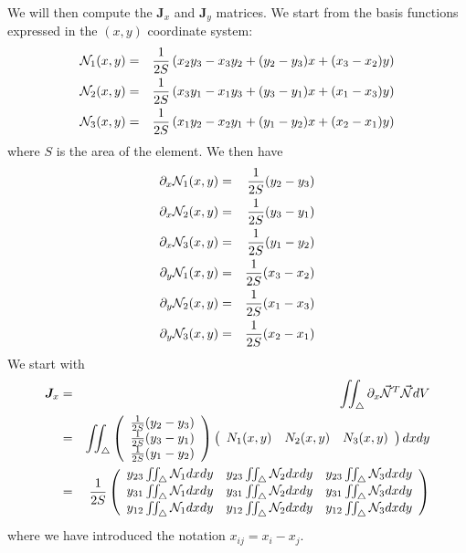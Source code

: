 We will then compute the ${\bm J}_x$ and ${\bm J}_y$ matrices.
We start from the basis functions expressed in the $(x,y)$ coordinate system:
\begin{eqnarray}
{\mathcal{N}}_1(x,y) &=& \frac{1}{2S} \left( x_2y_3-x_3y_2+(y_2-y_3)x+(x_3-x_2)y   \right) \nonumber\\
{\mathcal{N}}_2(x,y) &=& \frac{1}{2S} \left( x_3y_1-x_1y_3+(y_3-y_1)x+(x_1-x_3)y   \right) \nonumber\\
{\mathcal{N}}_3(x,y) &=& \frac{1}{2S} \left( x_1y_2-x_2y_1+(y_1-y_2)x+(x_2-x_1)y   \right) \nonumber
\end{eqnarray}
where $S$ is the area of the element.
We then have 
\begin{eqnarray}
\partial_x {\mathcal{N}}_1(x,y) &=& \frac{1}{2S}  (y_2-y_3) \nonumber\\
\partial_x {\mathcal{N}}_2(x,y) &=& \frac{1}{2S}  (y_3-y_1) \nonumber\\
\partial_x {\mathcal{N}}_3(x,y) &=& \frac{1}{2S}  (y_1-y_2) \nonumber\\
\partial_y {\mathcal{N}}_1(x,y) &=& \frac{1}{2S}  (x_3-x_2) \nonumber\\
\partial_y {\mathcal{N}}_2(x,y) &=& \frac{1}{2S}  (x_1-x_3) \nonumber\\
\partial_y {\mathcal{N}}_3(x,y) &=& \frac{1}{2S}  (x_2-x_1) \nonumber
\end{eqnarray}
We start with
\begin{eqnarray}
{\bm J}_x
&=& \iint_\triangle  \partial_x \vec{{\mathcal{N}}}^T \vec{{\mathcal{N}}} dV \nonumber\\
&=&  \iint_\triangle 
\left(
\begin{array}{c}
\frac{1}{2S}(y_2-y_3) \\
\frac{1}{2S}(y_3-y_1) \\
\frac{1}{2S}(y_1-y_2)
\end{array}
\right)
\left(
\begin{array}{ccc}
N_1(x,y) & N_2(x,y) & N_3(x,y) 
\end{array}
\right) dx dy \nonumber\\
&=& \frac{1}{2S} 
\left(
\begin{array}{ccc}
y_{23} \iint_\triangle {\mathcal{N}}_1 dx dy & y_{23} \iint_\triangle {\mathcal{N}}_2 dx dy & y_{23} \iint_\triangle {\mathcal{N}}_3 dx dy \\
y_{31} \iint_\triangle {\mathcal{N}}_1 dx dy & y_{31} \iint_\triangle {\mathcal{N}}_2 dx dy & y_{31} \iint_\triangle {\mathcal{N}}_3 dx dy \\
y_{12} \iint_\triangle {\mathcal{N}}_1 dx dy & y_{12} \iint_\triangle {\mathcal{N}}_2 dx dy & y_{12} \iint_\triangle {\mathcal{N}}_3 dx dy 
\end{array}
\right) 
\end{eqnarray}
where we have introduced the notation $x_{ij}=x_i-x_j$.
